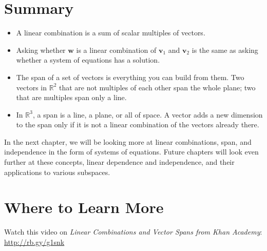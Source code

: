 \section{Summary}
\begin{itemize}
\item A linear combination is a sum of scalar multiples of vectors.
\item Asking whether $\mathbf{w}$ is a linear combination of $\mathbf{v}_1$
and $\mathbf{v}_2$ is the same as asking whether a system of equations has
a solution.
\item The span of a set of vectors is everything you can build from them.
Two vectors in $\mathbb{R}^2$ that are not multiples of each other span
the whole plane; two that are multiples span only a line.
\item In $\mathbb{R}^3$, a span is a line, a plane, or all of space. A vector
adds a new dimension to the span only if it is not a linear combination of the
vectors already there.
\end{itemize}

In the next chapter, we will be looking more at linear combinations, span, and independence in the form of systems of equations. Future chapters will look even further at these concepts, linear dependence and independence, and their applications to various subspaces.

\section{Where to Learn More}
Watch this video on \emph{Linear Combinations and Vector Spans from Khan
Academy}: \url{http://rb.gy/g1snk}
